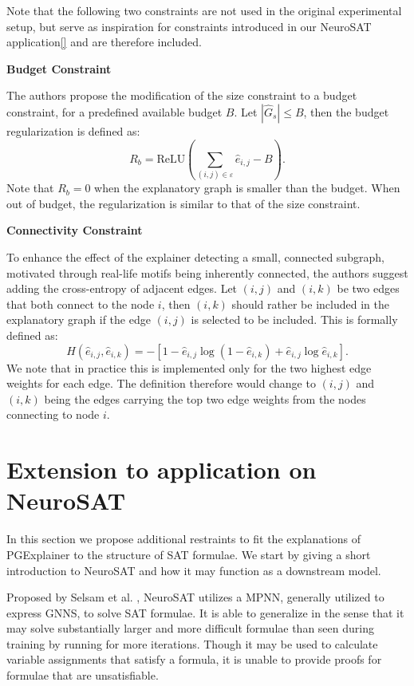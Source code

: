 Note that the following two constraints are not used in the original experimental setup, but serve as inspiration for constraints introduced in our NeuroSAT application\ref{} and are therefore included. \bigskip

\textbf{Budget Constraint}\par
The authors propose the modification of the size constraint to a budget constraint, for a predefined available budget $B$. Let $|\hat{G}_s| \leq B$, then the budget regularization is defined as:
\begin{equation}
    R_b = \text{ReLU}(\sum_{(i,j)\in \varepsilon}\hat{e}_{i,j}-B).
\end{equation}
Note that $R_b = 0$ when the explanatory graph is smaller than the budget. When out of budget, the regularization is similar to that of the size constraint. \bigskip

\textbf{Connectivity Constraint}\par
To enhance the effect of the explainer detecting a small, connected subgraph, motivated through real-life motifs being inherently connected, the authors suggest adding the cross-entropy of adjacent edges. Let $(i,j)$ and $(i,k)$ be two edges that both connect to the node $i$, then $(i,k)$ should rather be included in the explanatory graph if the edge $(i,j)$ is selected to be included. This is formally defined as:
\begin{equation}
    H(\hat{e}_{i,j},\hat{e}_{i,k}) = -[1-\hat{e}_{i,j}\log(1-\hat{e}_{i,k})+\hat{e}_{i,j}\log \hat{e}_{i,k}].
\end{equation}
We note that in practice this is implemented only for the two highest edge weights for each edge. The definition therefore would change to $(i,j)$ and $(i,k)$ being the edges carrying the top two edge weights from the nodes connecting to node $i$.


\section{Extension to application on NeuroSAT}
\label{sec:NeuroSAT_extension}
In this section we propose additional restraints to fit the explanations of PGExplainer to the structure of SAT formulae. We start by giving a short introduction to NeuroSAT\cite{selsam2018learning} and how it may function as a downstream model.

 \bigskip
Proposed by Selsam et al. \cite{selsam2018learning}, NeuroSAT utilizes a MPNN, generally utilized to express GNNS, to solve SAT formulae. It is able to generalize in the sense that it may solve substantially larger and more difficult formulae than seen during training by running for more iterations. Though it may be used to calculate variable assignments that satisfy a formula, it is unable to provide proofs for formulae that are unsatisfiable.

